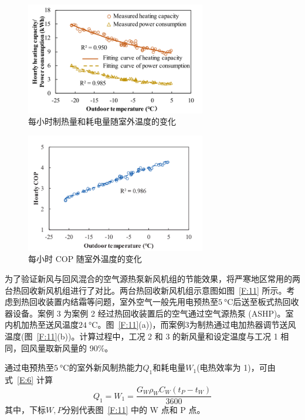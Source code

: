 \begin{figure}
	\centering
	\includegraphics[width=0.7\textwidth]{figure/figure_9}
	\caption{每小时制热量和耗电量随室外温度的变化}
	\label{F:9}
\end{figure}

\begin{figure}
	\centering
	\includegraphics[width=0.7\textwidth]{figure/figure_10}
	\caption{每小时 COP 随室外温度的变化}
	\label{F:10}
\end{figure}

为了验证新风与回风混合的空气源热泵新风机组的节能效果，将严寒地区常用的两台热回收新风机组进行了对比。两台热回收新风机组示意图如图~\ref{F:11} 所示。考虑到热回收装置内结霜等问题，室外空气一般先用电预热至$\qty{5}{\degreeCelsius} $后送至板式热回收器设备。案例 3 为案例 2 经过热回收装置后的空气通过空气源热泵 (ASHP)。室内机加热至送风温度$\qty{24}{\degreeCelsius} $。图~\ref{F:11}(a))，而案例3为制热通过电加热器调节送风温度(图~\ref{F:11}(b))。计算过程中，工况 2 和 3 的新风量和设定温度与工况 1 相同，回风量取新风量的 90\%。

通过电预热至$\qty{5}{\degreeCelsius} $的室外新风制热能力$Q_1$和耗电量$W_1$(电热效率为 1)，可由式~\ref{E:6} 计算
\begin{equation}\label{E:6}
	Q_1 = W_1 = \frac{G_W \rho_W C_W (t_P - t_W)}{3600} 
\end{equation}
其中，下标$W, P$分别代表图~\ref{F:11} 中的 W 点和 P 点。

